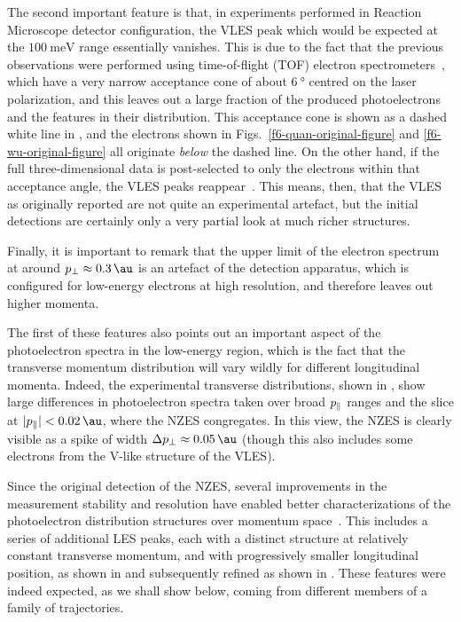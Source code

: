 The second important feature is that, in experiments performed in Reaction Microscope detector configuration, the VLES peak which would be expected at the $\SI{100}{\milli\electronvolt}$ range essentially vanishes. This is due to the fact that the previous observations were performed using time-of-flight (TOF) electron spectrometers~\cite{VLES_initial, VLES_characterization}, which have a very narrow acceptance cone of about $\SI{6}{\degree}$ centred on the laser polarization, and this leaves out a large fraction of the produced photoelectrons and the features in their distribution. This acceptance cone is shown as a dashed white line in , and the electrons shown in Figs.~\ref{f6-quan-original-figure} and \ref{f6-wu-original-figure} all originate \textit{below} the dashed line. On the other hand, if the full three-dimensional data is post-selected to only the electrons within that acceptance angle, the VLES peaks reappear~\cite[p.~5]{pullen_kinematically_2014}. This means, then, that the VLES as originally reported are not quite an experimental artefact, but the initial detections are certainly only a very partial look at much richer structures.

Finally, it is important to remark that the upper limit of the electron spectrum at around $\pt\approx\SI{0.3}{\au}$ is an artefact of the detection apparatus, which is configured for low-energy electrons at high resolution, and therefore leaves out higher momenta.





The first of these features also points out an important aspect of the photoelectron spectra in the low-energy region, which is the fact that the transverse momentum distribution will vary wildly for different longitudinal momenta. Indeed, the experimental transverse distributions, shown in , show large differences in photoelectron spectra taken over broad ${p_{\parallel}}$ ranges and the slice at $|\pp|<\SI{0.02}{\au}$, where the NZES congregates. In this view, the NZES is clearly visible as a spike of width $\Delta\pt\approx\SI{0.05}{\au}$ (though this also includes some electrons from the V-like structure of the VLES).





Since the original detection of the NZES, several improvements in the measurement stability and resolution have enabled better characterizations of the photoelectron distribution structures over momentum space~\cite{ZES_paper}. This includes a series of additional LES peaks, each with a distinct structure at relatively constant transverse momentum, and with progressively smaller longitudinal position, as shown in  and subsequently refined \cite{Wolter_PRX} as shown in . These features were indeed expected, as we shall show below, coming from different members of a family of trajectories.


